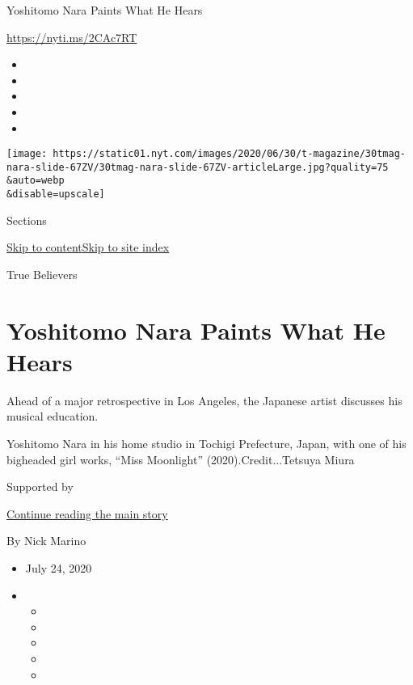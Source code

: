 Yoshitomo Nara Paints What He Hears

\url{https://nyti.ms/2CAc7RT}

\begin{itemize}
\item
\item
\item
\item
\item
\end{itemize}

\texttt{[image: https://static01.nyt.com/images/2020/06/30/t-magazine/30tmag-nara-slide-67ZV/30tmag-nara-slide-67ZV-articleLarge.jpg?quality=75\\\&auto=webp\\\&disable=upscale]}

Sections

\protect\hyperlink{site-content}{Skip to
content}\protect\hyperlink{site-index}{Skip to site index}

True Believers

\hypertarget{yoshitomo-nara-paints-what-he-hears}{%
\section{Yoshitomo Nara Paints What He
Hears}\label{yoshitomo-nara-paints-what-he-hears}}

Ahead of a major retrospective in Los Angeles, the Japanese artist
discusses his musical education.

Yoshitomo Nara in his home studio in Tochigi Prefecture, Japan, with one
of his bigheaded girl works, ``Miss Moonlight'' (2020).Credit...Tetsuya
Miura

Supported by

\protect\hyperlink{after-sponsor}{Continue reading the main story}

By Nick Marino

\begin{itemize}
\item
  July 24, 2020
\item
  \begin{itemize}
  \item
  \item
  \item
  \item
  \item
  \end{itemize}
\end{itemize}

